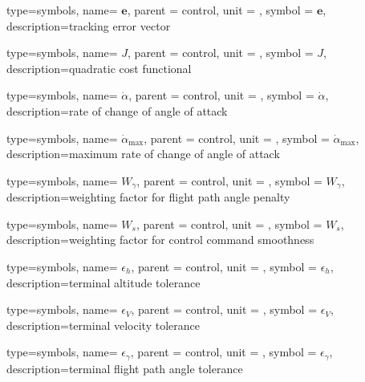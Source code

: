 {type=symbols,
    name= \ensuremath{\mathbf{e}},
    parent = {control},
    unit = \unexpanded{},
    symbol = \ensuremath{\mathbf{e}},
    description={tracking error vector}
}

{type=symbols,
    name= \ensuremath{J},
    parent = {control},
    unit = \unexpanded{},
    symbol = \ensuremath{J},
    description={quadratic cost functional}
}

{type=symbols,
    name= \ensuremath{\dot{\alpha}},
    parent = {control},
    unit = \unexpanded{\si{\radian\per\second}},
    symbol = \ensuremath{\dot{\alpha}},
    description={rate of change of angle of attack}
}

{type=symbols,
    name= \ensuremath{\dot{\alpha}_{\text{max}}},
    parent = {control},
    unit = \unexpanded{\si{\radian\per\second}},
    symbol = \ensuremath{\dot{\alpha}_{\text{max}}},
    description={maximum rate of change of angle of attack}
}

{type=symbols,
    name= \ensuremath{W_{\gamma}},
    parent = {control},
    unit = \unexpanded{},
    symbol = \ensuremath{W_{\gamma}},
    description={weighting factor for flight path angle penalty}
}

{type=symbols,
    name= \ensuremath{W_{s}},
    parent = {control},
    unit = \unexpanded{},
    symbol = \ensuremath{W_{s}},
    description={weighting factor for control command smoothness}
}

{type=symbols,
    name= \ensuremath{\epsilon_{h}},
    parent = {control},
    unit = \unexpanded{\si{\meter}},
    symbol = \ensuremath{\epsilon_{h}},
    description={terminal altitude tolerance}
}

{type=symbols,
    name= \ensuremath{\epsilon_{V}},
    parent = {control},
    unit = \unexpanded{\si{\meter\per\second}},
    symbol = \ensuremath{\epsilon_{V}},
    description={terminal velocity tolerance}
}

{type=symbols,
    name= \ensuremath{\epsilon_{\gamma}},
    parent = {control},
    unit = \unexpanded{\si{\radian}},
    symbol = \ensuremath{\epsilon_{\gamma}},
    description={terminal flight path angle tolerance}
}
